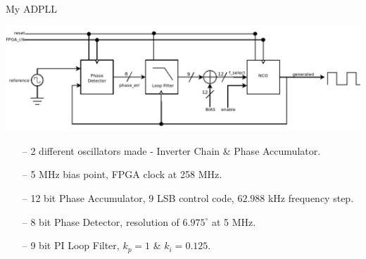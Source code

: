 \documentclass{beamer}
\begin{document}
\begin{frame}{My ADPLL}
 	\begin{center}
 		\includegraphics[scale=0.25]{../rtl}
 	\end{center}
		
	\begin{itemize}
		\item[--]
			2 different oscillators made - Inverter Chain \& Phase Accumulator.
		\item[--]
			5 MHz bias point, FPGA clock at 258 MHz.
		\item[--]
            12 bit Phase Accumulator, 9 LSB control code, $62.988$ kHz frequency step.
		\item[--]
			8 bit Phase Detector, resolution of $6.975^\circ$ at 5 MHz.
		\item[--]
			9 bit PI Loop Filter, $k_p=1$ \& $k_i=0.125$. %
	\end{itemize}
\end{frame}
\end{document}
